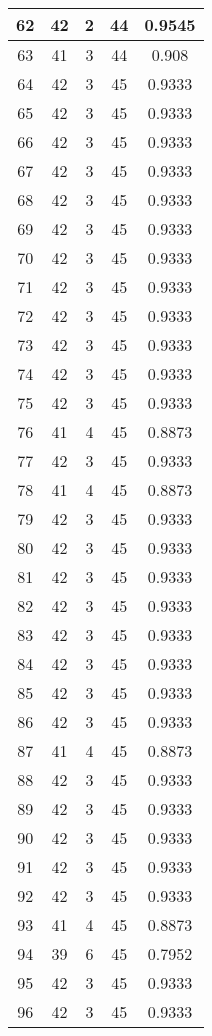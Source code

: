 \documentclass[letterpaper, 12pt]{article}
\begin{document}
\begin{longtable}{|c|c|c|c|c|}
\hline
62 & 42 & 2 & 44 & 0.9545 \\
\hline
63 & 41 & 3 & 44 & 0.908 \\
\hline
64 & 42 & 3 & 45 & 0.9333 \\
\hline
65 & 42 & 3 & 45 & 0.9333 \\
\hline
66 & 42 & 3 & 45 & 0.9333 \\
\hline
67 & 42 & 3 & 45 & 0.9333 \\
\hline
68 & 42 & 3 & 45 & 0.9333 \\
\hline
69 & 42 & 3 & 45 & 0.9333 \\
\hline
70 & 42 & 3 & 45 & 0.9333 \\
\hline
71 & 42 & 3 & 45 & 0.9333 \\
\hline
72 & 42 & 3 & 45 & 0.9333 \\
\hline
73 & 42 & 3 & 45 & 0.9333 \\
\hline
74 & 42 & 3 & 45 & 0.9333 \\
\hline
75 & 42 & 3 & 45 & 0.9333 \\
\hline
76 & 41 & 4 & 45 & 0.8873 \\
\hline
77 & 42 & 3 & 45 & 0.9333 \\
\hline
78 & 41 & 4 & 45 & 0.8873 \\
\hline
79 & 42 & 3 & 45 & 0.9333 \\
\hline
80 & 42 & 3 & 45 & 0.9333 \\
\hline
81 & 42 & 3 & 45 & 0.9333 \\
\hline
82 & 42 & 3 & 45 & 0.9333 \\
\hline
83 & 42 & 3 & 45 & 0.9333 \\
\hline
84 & 42 & 3 & 45 & 0.9333 \\
\hline
85 & 42 & 3 & 45 & 0.9333 \\
\hline
86 & 42 & 3 & 45 & 0.9333 \\
\hline
87 & 41 & 4 & 45 & 0.8873 \\
\hline
88 & 42 & 3 & 45 & 0.9333 \\
\hline
89 & 42 & 3 & 45 & 0.9333 \\
\hline
90 & 42 & 3 & 45 & 0.9333 \\
\hline
91 & 42 & 3 & 45 & 0.9333 \\
\hline
92 & 42 & 3 & 45 & 0.9333 \\
\hline
93 & 41 & 4 & 45 & 0.8873 \\
\hline
94 & 39 & 6 & 45 & 0.7952 \\
\hline
95 & 42 & 3 & 45 & 0.9333 \\
\hline
96 & 42 & 3 & 45 & 0.9333 \\

\end{longtable}
\end{document}
